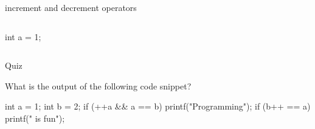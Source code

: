\documentclass[compress]{beamer}
\begin{document}
\begin{slide}
	\begin{block}{increment and decrement operators}

	\begin{columns}

	\begin{terminal}
	int a = 1;
	\end{terminal}

	\begin{table}
	\end{table}
	\end{columns}

	\end{block}
\end{slide}

\begin{slide}
	\begin{block}{Quiz}

	What is the output of the following code snippet?

	\begin{terminal}
	int a = 1;
	int b = 2;
	if (++a && a == b)
	    printf("Programming");
	if (b++ == a)
	    printf(" is fun");
	\end{terminal}

	\end{block}
\end{slide}
\end{document}
